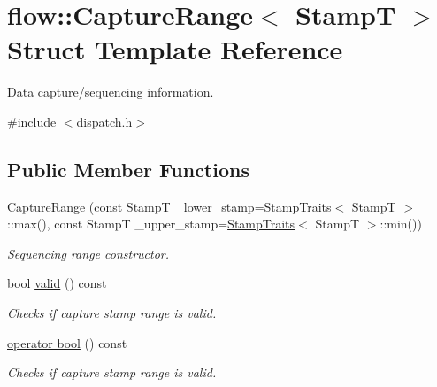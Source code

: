 \hypertarget{structflow_1_1_capture_range}{}\section{flow\+:\+:Capture\+Range$<$ StampT $>$ Struct Template Reference}
\label{structflow_1_1_capture_range}


Data capture/sequencing information.  




{\ttfamily \#include $<$dispatch.\+h$>$}

\subsection*{Public Member Functions}
\begin{DoxyCompactItemize}
\item 
\hyperlink{structflow_1_1_capture_range_a525dd2f7119611ebdf7d02f2a5a15af9}{Capture\+Range} (const StampT \+\_\+lower\+\_\+stamp=\hyperlink{structflow_1_1_stamp_traits}{Stamp\+Traits}$<$ StampT $>$\+::max(), const StampT \+\_\+upper\+\_\+stamp=\hyperlink{structflow_1_1_stamp_traits}{Stamp\+Traits}$<$ StampT $>$\+::min())
\begin{DoxyCompactList}\small\item\em Sequencing range constructor. \end{DoxyCompactList}\item 
bool \hyperlink{structflow_1_1_capture_range_accdfed5d9a2410aed2a5e242b7d1335b}{valid} () const
\begin{DoxyCompactList}\small\item\em Checks if capture stamp range is valid. \end{DoxyCompactList}\item 
\hyperlink{structflow_1_1_capture_range_a9e48db61b83970a676a34c8af7bae594}{operator bool} () const
\begin{DoxyCompactList}\small\item\em Checks if capture stamp range is valid. \end{DoxyCompactList}\end{DoxyCompactItemize}
